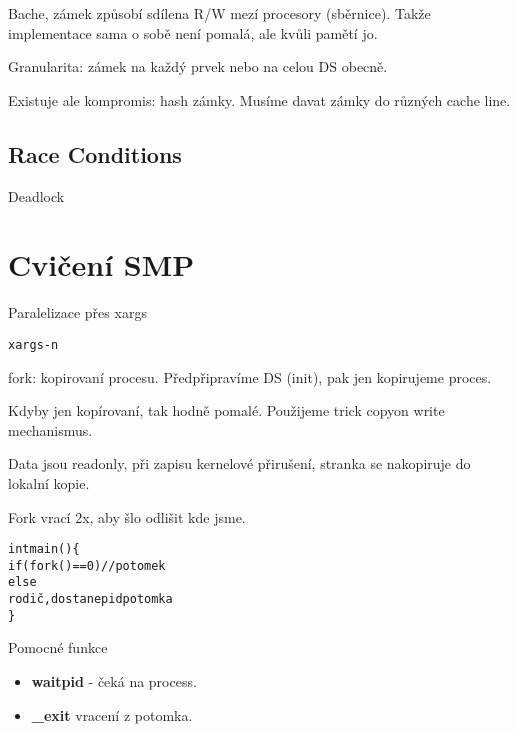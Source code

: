 \begin{note}
	Bache, zámek způsobí sdílena R/W mezí procesory (sběrnice).
	Takže implementace sama o sobě není pomalá, ale kvůli pamětí jo.
\end{note}

\begin{definition}
	Granularita: zámek na každý prvek nebo na celou DS obecně.

	Existuje ale kompromis: hash zámky.
	Musíme davat zámky do různých cache line.
\end{definition}

\subsection{Race Conditions}

\begin{definition}
	Deadlock
\end{definition}


\section{\texorpdfstring{Cvičení SMP}{Cvičení SMP}}
\vspace{5mm}
\large

\begin{example}
	Paralelizace přes xargs
	\begin{alltt}
		xargs -n
	\end{alltt}

\end{example}

\begin{example}
	fork: kopirovaní procesu.
	Předpřipravíme DS (init), pak jen kopirujeme proces.

	Kdyby jen kopírovaní, tak hodně pomalé. Použijeme trick copyon write mechanismus.

	Data jsou readonly, při zapisu kernelové přirušení, stranka se nakopiruje do lokalní kopie.
\end{example}

\begin{note}
	Fork vrací 2x, aby šlo odlišit kde jsme.
	\begin{alltt}
		int main()\{
		\tab if(fork() == 0) // potomek
		\tab else \\rodič, dostane pid potomka
		\}
	\end{alltt}

\end{note}
Pomocné funkce
\begin{itemize}
	\item \textbf{waitpid} - čeká na process.
	\item \textbf{\_exit} vracení z potomka.
\end{itemize}


